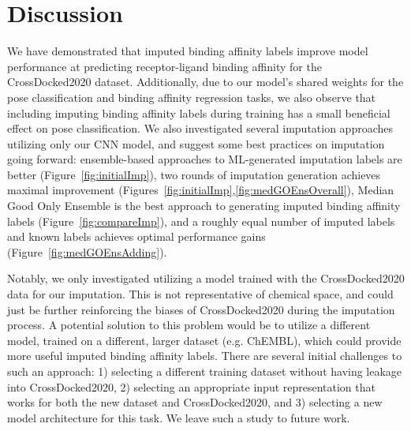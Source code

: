\documentclass[journal=jcim,manuscript=article]{achemso}
\begin{document}
\section{Discussion}
We have demonstrated that imputed binding affinity labels improve model performance at predicting receptor-ligand binding affinity for the CrossDocked2020 dataset.
Additionally, due to our model's shared weights for the pose classification and binding affinity regression tasks, we also observe that including imputing binding affinity labels during training has a small beneficial effect on pose classification.
We also investigated several imputation approaches utilizing only our CNN model, and suggest some best practices on imputation going forward: ensemble-based approaches to ML-generated imputation labels are better (Figure~\ref{fig:initialImp}), two rounds of imputation generation achieves maximal improvement (Figures~\ref{fig:initialImp},\ref{fig:medGOEnsOverall}), Median Good Only Ensemble is the best approach to generating imputed binding affinity labels (Figure~\ref{fig:compareImp}), and a roughly equal number of imputed labels and known labels achieves optimal performance gains (Figure~\ref{fig:medGOEnsAdding}).

Notably, we only investigated utilizing a model trained with the CrossDocked2020 data for our imputation.
This is not representative of chemical space, and could just be further reinforcing the biases of CrossDocked2020 during the imputation process.
A potential solution to this problem would be to utilize a different model, trained on a different, larger dataset (e.g. ChEMBL\cite{Chembl}), which could provide more useful imputed binding affinity labels.
There are several initial challenges to such an approach: 1) selecting a different training dataset without having leakage into CrossDocked2020, 2) selecting an appropriate input representation that works for both the new dataset and CrossDocked2020, and 3) selecting a new model architecture for this task.
We leave such a study to future work.
\end{document}
